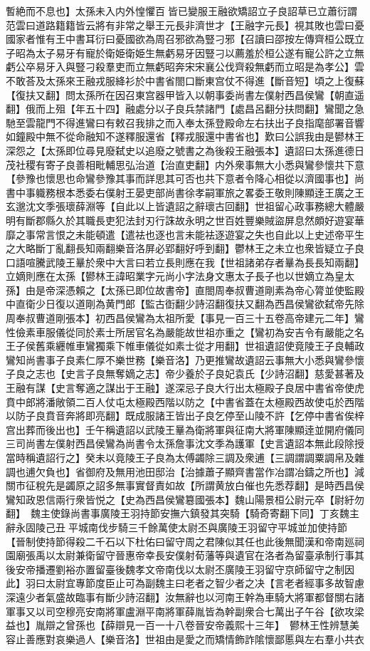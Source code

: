 暫絶而不息也】太孫未入内外惶懼百皆已變服王融欲矯詔立子良詔草已立蕭衍謂范雲曰道路籍籍皆云將有非常之舉王元長非濟世才【王融字元長】視其敗也雲曰憂國家者惟有王中書耳衍曰憂國欲為周召邪欲為豎刁邪【召讀曰邵按左傳齊桓公既立子昭為太子易牙有寵於衛姫衛姫生無虧易牙因豎刁以薦羞於桓公遂有寵公許之立無虧公卒易牙入與豎刁殺羣吏而立無虧昭奔宋宋襄公伐齊殺無虧而立昭是為孝公】雲不敢荅及太孫來王融戎服絳衫於中書省閤口斷東宫仗不得進【斷音短】頃之上復蘇【復扶又翻】問太孫所在因召東宫器甲皆入以朝事委尚書左僕射西昌侯鸞【朝直遥翻】俄而上殂【年五十四】融處分以子良兵禁諸門【處昌呂翻分扶問翻】鸞聞之急馳至雲龍門不得進鸞曰有敕召我排之而入奉太孫登殿命左右扶出子良指麾部署音響如鐘殿中無不從命融知不遂釋服還省【釋戎服還中書省也】歎曰公誤我由是鬰林王深怨之【太孫即位尋見廢弑史以追廢之號書之為後殺王融張本】遺詔曰太孫進德日茂社稷有寄子良善相毗輔思弘治道【治直吏翻】内外衆事無大小悉與鸞參懷共下意【參豫也懷思也命鸞參豫其事而詳思其可否也共下意者令降心相從以濟國事也】尚書中事軄務根本悉委右僕射王晏吏部尚書徐孝嗣軍旅之畧委王敬則陳顯逹王廣之王玄邈沈文季張瓌薛淵等【自此以上皆遺詔之辭瓌古回翻】世祖留心政事務總大體嚴明有斷郡縣久於其職長吏犯法封刃行誅故永明之世百姓豐樂賊盜屏息然頗好遊宴華靡之事常言恨之未能頓遣【遣袪也逐也言未能袪逐遊宴之失也自此以上史述帝平生之大略斷丁亂翻長知兩翻樂音洛屏必郢翻好呼到翻】鬱林王之未立也衆皆疑立子良口語喧騰武陵王曅於衆中大言曰若立長則應在我【世祖諸弟存者曅為長長知兩翻】立嫡則應在太孫【鬰林王諱昭業字元尚小字法身文惠太子長子也以世嫡立為皇太孫】由是帝深憑賴之【太孫已即位故書帝】直閤周奉叔曹道剛素為帝心膂並使監殿中直衛少日復以道剛為黄門郎【監古衘翻少詩沼翻復扶又翻為西昌侯鸞欲弑帝先除周奉叔曹道剛張本】初西昌侯鸞為太祖所愛【事見一百三十五卷高帝建元二年】鸞性儉素車服儀從同於素士所居官名為嚴能故世祖亦重之【鸞初為安吉令有嚴能之名王子侯舊乘纒帷車鸞獨乘下帷車儀從如素士從才用翻】世祖遺詔使竟陵王子良輔政鸞知尚書事子良素仁厚不樂世務【樂音洛】乃更推鸞故遺詔云事無大小悉與鸞參懷子良之志也【史言子良無奪嫡之志】帝少養於子良妃袁氏【少詩沼翻】慈愛甚著及王融有謀【史言奪適之謀出于王融】遂深忌子良大行出太極殿子良居中書省帝使虎賁中郎將潘敞領二百人仗屯太極殿西階以防之【中書省蓋在太極殿西故使屯於西階以防子良賁音奔將即亮翻】既成服諸王皆出子良乞停至山陵不許【乞停中書省俟梓宫出葬而後出也】壬午稱遺詔以武陵王曅為衛將軍與征南大將軍陳顯逹並開府儀同三司尚書左僕射西昌侯鸞為尚書令太孫詹事沈文季為護軍【史言遺詔本無此段除授當時稱遺詔行之】癸未以竟陵王子良為太傅蠲除三調及衆逋【三調謂調粟調帛及雜調也逋欠負也】省御府及無用池田邸治【治據蕭子顯齊書當作冶謂冶鑄之所也】減關市征稅先是蠲原之詔多無事實督責如故【所謂黄放白催也先悉荐翻】是時西昌侯鸞知政恩信兩行衆皆悦之【史為西昌侯鸞簒國張本】魏山陽景桓公尉元卒【尉紆勿翻】　魏主使錄尚書事廣陵王羽持節安撫六鎮發其突騎【騎奇寄翻下同】丁亥魏主辭永固陵己丑平城南伐步騎三千餘萬使太尉丕與廣陵王羽留守平城並加使持節【晉制使持節得殺二千石以下杜佑曰留守周之君陳似其任也此後無聞漢和帝南廵祠園廟張禹以太尉兼衛留守晉惠帝幸長安僕射荀藩等與遺官在洛者為留臺承制行事其後安帝播遷劉裕亦置留臺後魏孝文帝南伐以太尉丕廣陵王羽留守京師留守之制因此】羽曰太尉宜專節度臣止可為副魏主曰老者之智少者之决【言老者經事多故智慮深遠少者氣盛故臨事有斷少詩沼翻】汝無辭也以河南王幹為車騎大將軍都督關右諸軍事又以司空穆亮安南將軍盧淵平南將軍薛胤皆為幹副衆合七萬出子午谷【欲攻梁益也】胤辯之曾孫也【薛辯見一百一十八卷晉安帝義熙十三年】　鬰林王性辨慧美容止善應對哀樂過人【樂音洛】世祖由是愛之而矯情飾詐隂懷鄙慝與左右羣小共衣
